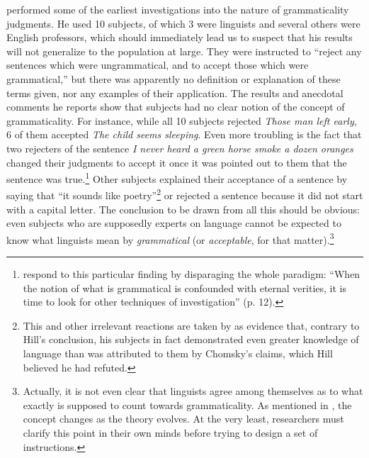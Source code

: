 \citet{Hill1961} performed some of the earliest investigations into the nature of grammaticality judgments. He used 10 subjects, of which 3 were linguists and several others were English professors, which should immediately lead us to suspect that his results will not generalize to the population at large. They were instructed to ``reject any sentences which were ungrammatical, and to accept those which were grammatical,'' but there was apparently no definition or explanation of these terms given, nor any examples of their application. The results and anecdotal comments he reports show  that subjects had no clear notion of the concept of grammaticality. For instance, while all 10 subjects rejected \textit{Those man left early}, 6 of them accepted \textit{The child seems sleeping}. Even more troubling is the
fact that two rejecters of the sentence \textit{I never heard a green horse smoke a dozen oranges} changed their judgments to accept it once it was pointed out to them that the sentence was true.\footnote{ \citet{QuirkEtAl1966} respond to this particular finding by disparaging the whole paradigm: ``When the notion of what is grammatical is confounded with eternal verities, it is time to look for other techniques of investigation'' (p. 12).}
 Other subjects explained their acceptance of a sentence by saying that ``it sounds like poetry''\footnote{This and other irrelevant reactions are taken by \citet{Lees1976} as evidence that, contrary to Hill's conclusion, his subjects in fact demonstrated even greater knowledge of language than was attributed to them by Chomsky's claims, which Hill believed he had refuted.}
or rejected a sentence because it did not start with a capital letter. The conclusion to be drawn from all this should be obvious: even subjects who are supposedly experts on language cannot be expected to know what linguists mean by \textit{grammatical} (or \textit{acceptable}, for that matter).\footnote{Actually, it is not even clear that linguists agree among themselves as to what exactly is supposed to count towards grammaticality. As mentioned in , the concept changes as the theory evolves. At the very least, researchers must clarify this point in their own minds before trying to design a set of instructions.}
